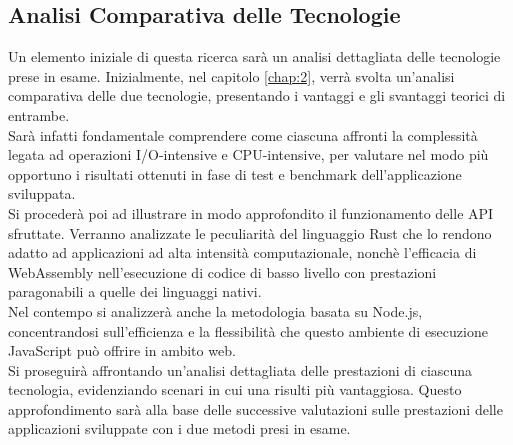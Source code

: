 \subsection{Analisi Comparativa delle Tecnologie}
Un elemento iniziale di questa ricerca sarà un analisi dettagliata delle tecnologie prese in esame. 
Inizialmente, nel capitolo \ref{chap:2}, verrà svolta un'analisi comparativa delle due tecnologie, presentando i vantaggi e gli svantaggi teorici di entrambe.
\\Sarà infatti fondamentale comprendere come ciascuna affronti la complessità legata ad operazioni I/O-intensive e CPU-intensive, per valutare nel modo più opportuno i risultati ottenuti in fase di test e benchmark dell'applicazione sviluppata.
\\Si procederà poi ad illustrare in modo approfondito il funzionamento delle API sfruttate. Verranno analizzate le peculiarità del linguaggio Rust che lo rendono adatto ad applicazioni ad alta intensità computazionale, nonchè l'efficacia di WebAssembly nell'esecuzione di codice di basso livello con prestazioni paragonabili a quelle dei linguaggi nativi.
\\Nel contempo si analizzerà anche la metodologia basata su Node.js, concentrandosi sull'efficienza e la flessibilità che questo ambiente di esecuzione JavaScript può offrire in ambito web.
\\Si proseguirà affrontando un'analisi dettagliata delle prestazioni di ciascuna tecnologia, evidenziando scenari in cui una risulti più vantaggiosa. Questo approfondimento sarà alla base delle successive valutazioni sulle prestazioni delle applicazioni sviluppate con i due metodi presi in esame.
